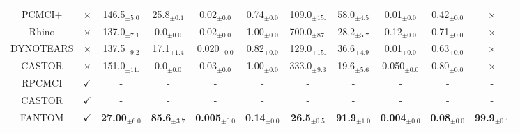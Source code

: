 \begin{table}[H]
{\begin{tabular}{@{}cccccccccc|c@{}}
PCMCI+ & \multicolumn{1}{c|}{$\times$}   & 146.5$_{\pm5.0}$  & 25.8$_{\pm0.1}$ & 0.02$_{\pm0.0}$ & 0.74$_{\pm0.0}$ &
             109.0$_{\pm15.}$ & 58.0$_{\pm4.5}$ & 0.01$_{\pm0.0}$ & 0.42$_{\pm0.0}$ & $\times$ \\
    Rhino & \multicolumn{1}{c|}{$\times$}  & 137.0$_{\pm7.1}$  & 0.0$_{\pm0.0}$  & 0.02$_{\pm0.0}$ & 1.00$_{\pm0.0}$ &
             700.0$_{\pm87.}$ & 28.2$_{\pm5.7}$ & 0.12$_{\pm0.0}$ & 0.71$_{\pm0.0}$& $\times$ \\
    DYNOTEARS & \multicolumn{1}{c|}{$\times$} & 137.5$_{\pm9.2}$  & 17.1$_{\pm1.4}$ & 0.020$_{\pm0.0}$ & 0.82$_{\pm0.0}$ &
             129.0$_{\pm15.}$ & 36.6$_{\pm4.9}$ & 0.01$_{\pm0.0}$ & 0.63$_{\pm0.0}$& $\times$  \\
    CASTOR & \multicolumn{1}{c|}{$\times$} &  151.0$_{\pm\text{11.}}$ & 0.0$_{\pm\text{0.0}}$  & 0.03$_{\pm0.0}$ & 1.00$_{\pm0.0}$ &
             333.0$_{\pm9.3}$ & 19.6$_{\pm5.6}$ & 0.050$_{\pm0.0}$ & 0.80$_{\pm0.0}$  & $\times$  \\
    \midrule
    RPCMCI & \multicolumn{1}{c|}{$\checkmark$} &  - & - & - & - & - & - & - & - & -  \\
    CASTOR & \multicolumn{1}{c|}{$\checkmark$} &  - & - & - & - & - & - & - & - & -  \\
\rowcolor{gray!20} FANTOM                 & \multicolumn{1}{c|}{$\checkmark$}           & \textbf{27.00}$_{\pm6.0}$ & \textbf{85.6}$_{\pm3.7}$                                   & \textbf{0.005}$_{\pm0.0}$                                                 & \textbf{0.14}$_{\pm0.0}$                                                   & \textbf{26.5}$_{\pm0.5}$ & \textbf{91.9}$_{\pm1.0}$                                   & \textbf{0.004}$_{\pm0.0}$                                                 & \multicolumn{1}{c|}{\textbf{0.08}$_{\pm0.0}$}                                                   & \textbf{99.9}$_{\pm0.1}$ \\ \bottomrule
\end{tabular}}
\end{table}

